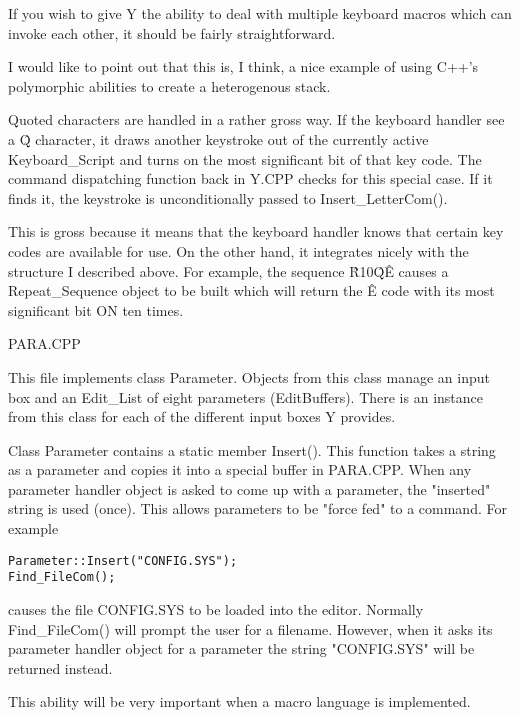 If you wish to give Y the ability to deal with multiple keyboard macros which can invoke each
other, it should be fairly straightforward.

I would like to point out that this is, I think, a nice example of using C++'s polymorphic
abilities to create a heterogenous stack.

Quoted characters are handled in a rather gross way. If the keyboard handler see a \^Q
character, it draws another keystroke out of the currently active Keyboard\_Script and turns on
the most significant bit of that key code. The command dispatching function back in Y.CPP checks
for this special case. If it finds it, the keystroke is unconditionally passed to
Insert\_LetterCom().

This is gross because it means that the keyboard handler knows that certain key codes are
available for use. On the other hand, it integrates nicely with the structure I described above.
For example, the sequence \^R10\^Q\^E causes a Repeat\_Sequence object to be built which will
return the \^E code with its most significant bit ON ten times.

PARA.CPP

This file implements class Parameter. Objects from this class manage an input box and an
Edit\_List of eight parameters (EditBuffers). There is an instance from this class for each of
the different input boxes Y provides.

Class Parameter contains a static member Insert(). This function takes a string as a parameter
and copies it into a special buffer in PARA.CPP. When any parameter handler object is asked to
come up with a parameter, the "inserted" string is used (once). This allows parameters to be
"force fed" to a command. For example

\begin{verbatim}
Parameter::Insert("CONFIG.SYS");
Find_FileCom();
\end{verbatim}

causes the file CONFIG.SYS to be loaded into the editor. Normally Find\_FileCom() will prompt the
user for a filename. However, when it asks its parameter handler object for a parameter the
string "CONFIG.SYS" will be returned instead.

This ability will be very important when a macro language is implemented.
